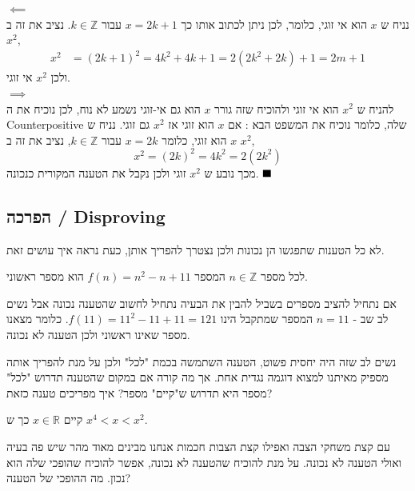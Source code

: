 \documentclass[a4paper,12pt]{article}
\renewcommand{\qed}{\hfill\blacksquare}
\newcommand{\te}[1]{\textenglish{#1}}
\begin{document}
\begin{RTL}
\begin{Proof}
  $\impliedby$\\
  נניח ש $x$ הוא אי זוגי, כלומר, לכן ניתן לכתוב אותו כך $x = 2k + 1$ עבור $k \in \mathbb{Z}$. נציב את זה ב $x^2$,
  \begin{align}
    x^2 &= (2k + 1)^2 = 4k^2 + 4k + 1 = 2(2k^2 + 2k) + 1 = 2m + 1
  \end{align}
  ולכן $x^2$ אי זוגי.\\

  $\implies$\\

  להניח ש $x^2$ הוא אי זוגי ולהוכיח שזה גורר $x$ הוא גם אי-זוגי נשמע לא נוח, לכן נוכיח את ה \te{Counterpositive} שלה, כלומר נוכיח את המשפט הבא : אם $x$ הוא זוגי אז $x^2$ גם זוגי. נניח ש $x$ הוא זוגי, כלומר $x = 2k$ עבור $k \in \mathbb{Z}$, נציב את זה ב $x^2$,
$$
x^2 = (2k)^2 = 4k^2 = 2(2k^2)
$$
מכך נובע ש $x^2$ זוגי ולכן נקבל את הטענה המקורית כנכונה. $\qed$
\end{Proof}

\subsection{הפרכה / \te{Disproving}}
לא כל הטענות שתפגשו הן נכונות ולכן נצטרך להפריך אותן, כעת נראה איך עושים זאת.

\begin{conjecture}
 לכל מספר $n \in \mathbb{Z}$ המספר $f(n) = n^2 - n + 11$ הוא מספר ראשוני.
\end{conjecture}
אם נתחיל להציב מספרים בשביל להבין את הבעיה נתחיל לחשוב שהטענה נכונה אבל נשים לב שב - $n = 11$ המספר שמתקבל הינו $f(11) = 11^2 - 11 + 11 = 121$. כלומר מצאנו מספר שאינו ראשוני ולכן הטענה לא נכונה.

\begin{remark}
  נשים לב שזה היה יחסית פשוט, הטענה השתמשה בכמת "לכל" ולכן על מנת להפריך אותה מספיק מאיתנו למצוא דוגמה נגדית אחת. אך מה קורה אם במקום שהטענה תדרוש "לכל" מספר היא תדרוש  ש"קיים" מספר? איך מפריכים טענה כזאת?
\end{remark}

\begin{conjecture}
  קיים $x \in \mathbb{R}$ כך ש $x^4 < x < x^2$.
\end{conjecture}
עם קצת משחקי הצבה ואפילו קצת הצבות חכמות אנחנו מבינים מאוד מהר שיש פה בעיה ואולי הטענה לא נכונה. על מנת להוכיח שהטענה לא נכונה, אפשר להוכיח שהופכי שלה הוא נכון. מה ההופכי של הטענה?


\end{RTL}
\end{document}
